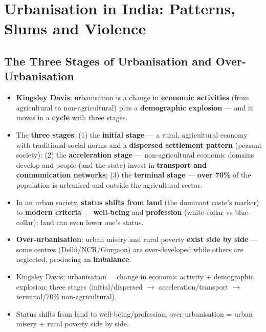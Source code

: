 \chapter{Urbanisation in India: Patterns, Slums and Violence}

\section{The Three Stages of Urbanisation and Over-Urbanisation}

\begin{KeyConcept}
\begin{itemize}
\item \textbf{Kingsley Davis}: urbanisation is a change in \textbf{economic activities} (from agricultural to non-agricultural) plus a \textbf{demographic explosion} --- and it moves in a \textbf{cycle} with three stages.
\item The \textbf{three stages}: (1) the \textbf{initial stage} --- a rural, agricultural economy with traditional social norms and a \textbf{dispersed settlement pattern} (peasant society); (2) the \textbf{acceleration stage} --- non-agricultural economic domains develop and people (and the state) invest in \textbf{transport and communication networks}; (3) the \textbf{terminal stage} --- \textbf{over 70\%} of the population is urbanised and outside the agricultural sector.
\item In an urban society, \textbf{status shifts from land} (the dominant caste's marker) to \textbf{modern criteria} --- \textbf{well-being} and \textbf{profession} (white-collar vs blue-collar); land can even lower one's status.
\item \textbf{Over-urbanisation}: urban misery and rural poverty \textbf{exist side by side} --- some centres (Delhi/NCR/Gurgaon) are over-developed while others are neglected, producing an \textbf{imbalance}.
\end{itemize}
\end{KeyConcept}

\begin{QuickRevision}
\begin{itemize}
\item Kingsley Davis: urbanisation = change in economic activity + demographic explosion; three stages (initial/dispersed $\rightarrow$ acceleration/transport $\rightarrow$ terminal/70\% non-agricultural).
\item Status shifts from land to well-being/profession; over-urbanisation = urban misery + rural poverty side by side.
\end{itemize}
\end{QuickRevision}

